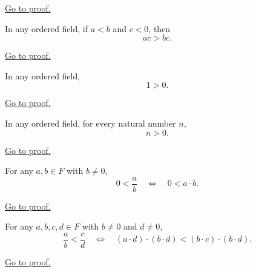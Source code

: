 \begin{remark*}[Proof]
\hyperref[prf:multiply-positive]{Go to proof.}
\end{remark*}

\begin{theorem}
\label{thm:multiply-negative}
In any ordered field, if $a<b$ and $c<0$, then
\[
ac>bc.
\]
\end{theorem}

\begin{remark*}[Proof]
\hyperref[prf:multiply-negative]{Go to proof.}
\end{remark*}

\begin{theorem}[$1$ Is Positive]
\label{thm:one-positive}
In any ordered field,
\[
1>0.
\]
\end{theorem}

\begin{remark*}[Proof]
\hyperref[prf:one-positive]{Go to proof.}
\end{remark*}

\begin{corollary}
\label{cor:n-positive}
In any ordered field, for every natural number $n$,
\[
n>0.
\]
\end{corollary}

\begin{remark*}[Proof]
\hyperref[prf:n-positive]{Go to proof.}
\end{remark*}

\begin{theorem}
\label{thm:positive-fraction-iff-positive-product}
For any $a,b\in F$ with $b\neq 0$,
\[
0<\frac{a}{b}
\quad\Longleftrightarrow\quad
0<a\cdot b.
\]
\end{theorem}

\begin{remark*}[Proof]
\hyperref[prf:positive-fraction-iff-positive-product]{Go to proof.}
\end{remark*}

\begin{theorem}
\label{thm:fraction-order-comparison-general}
For any $a,b,c,d\in F$ with $b\neq 0$ and $d\neq 0$,
\[
\frac{a}{b}<\frac{c}{d}
\quad\Longleftrightarrow\quad
(a\cdot d)\cdot(b\cdot d)<(b\cdot c)\cdot(b\cdot d).
\]
\end{theorem}

\begin{remark*}[Proof]
\hyperref[prf:fraction-order-comparison-general]{Go to proof.}
\end{remark*}

